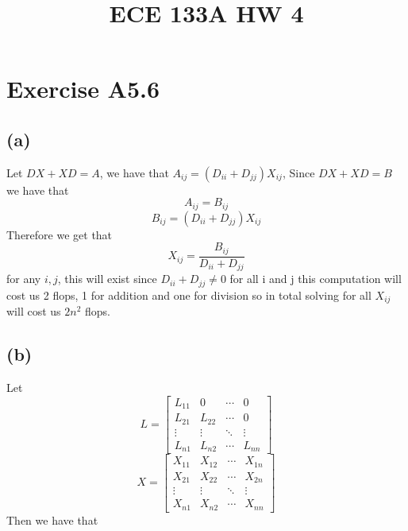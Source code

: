 
\title{ECE 133A HW 4}

\maketitle
\section*{Exercise A5.6}
\subsection*{(a)}
Let $DX+XD=A$, we have that $A_{ij}=(D_{ii}+D_{jj})X_{ij}$,
Since $DX+XD=B$ we have that 
$$A_{ij}=B_{ij}$$
$$B_{ij}=(D_{ii}+D_{jj})X_{ij}$$
Therefore we get that
$$X_{ij}=\frac{B_{ij}}{D_{ii}+D_{jj}}$$
for any $i,j$, this will exist since $D_{ii}+D_{jj}\neq 0$ for all i and j
this computation will cost us 2 flops, 1 for addition and one for division
so in total solving for all $X_{ij}$ will cost us $2n^2$ flops.
\subsection*{(b)}
Let
$$L=\begin{bmatrix}
    L_{11} & 0 & \cdots & 0 \\
    L_{21} & L_{22} & \cdots & 0 \\
    \vdots & \vdots & \ddots & \vdots \\
    L_{n1} & L_{n2} & \cdots & L_{nn}
\end{bmatrix}$$
$$
X=\begin{bmatrix}
    X_{11} & X_{12} & \cdots & X_{1n} \\
    X_{21} & X_{22} & \cdots & X_{2n} \\
    \vdots & \vdots & \ddots & \vdots \\
    X_{n1} & X_{n2} & \cdots & X_{nn}
\end{bmatrix}$$
Then we have that

